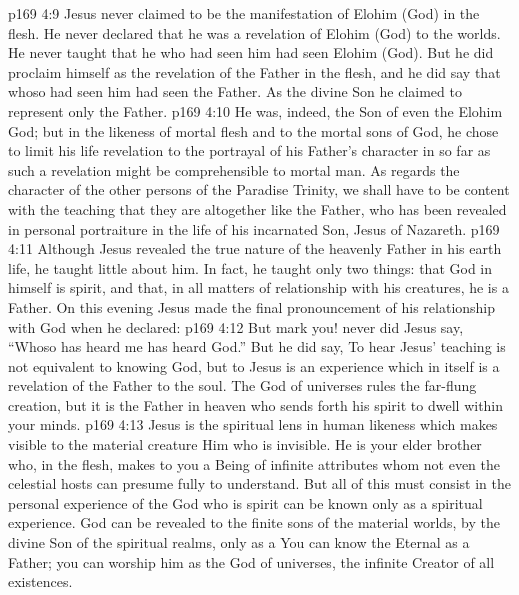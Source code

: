 \vs p169 4:9 Jesus never claimed to be the manifestation of Elohim (God) in the flesh. He never declared that he was a revelation of Elohim (God) to the worlds. He never taught that he who had seen him had seen Elohim (God). But he did proclaim himself as the revelation of the Father in the flesh, and he did say that whoso had seen him had seen the Father. As the divine Son he claimed to represent only the Father.
\vs p169 4:10 He was, indeed, the Son of even the Elohim God; but in the likeness of mortal flesh and to the mortal sons of God, he chose to limit his life revelation to the portrayal of his Father’s character in so far as such a revelation might be comprehensible to mortal man. As regards the character of the other persons of the Paradise Trinity, we shall have to be content with the teaching that they are altogether like the Father, who has been revealed in personal portraiture in the life of his incarnated Son, Jesus of Nazareth.
\vs p169 4:11 \pc Although Jesus revealed the true nature of the heavenly Father in his earth life, he taught little about him. In fact, he taught only two things: that God in himself is spirit, and that, in all matters of relationship with his creatures, he is a Father. On this evening Jesus made the final pronouncement of his relationship with God when he declared: 
\vs p169 4:12 But mark you! never did Jesus say, “Whoso has heard me has heard God.” But he did say,  To hear Jesus’ teaching is not equivalent to knowing God, but to  Jesus is an experience which in itself is a revelation of the Father to the soul. The God of universes rules the far\hyp{}flung creation, but it is the Father in heaven who sends forth his spirit to dwell within your minds.
\vs p169 4:13 Jesus is the spiritual lens in human likeness which makes visible to the material creature Him who is invisible. He is your elder brother who, in the flesh, makes  to you a Being of infinite attributes whom not even the celestial hosts can presume fully to understand. But all of this must consist in the personal experience of the  God who is spirit can be known only as a spiritual experience. God can be revealed to the finite sons of the material worlds, by the divine Son of the spiritual realms, only as a  You can know the Eternal as a Father; you can worship him as the God of universes, the infinite Creator of all existences.
\quizlink
